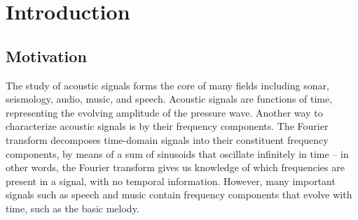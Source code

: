 \documentclass[letter,12pt,notitlepage]{article}
\title{\ThesisTitle}
\author{\vspace{1em}\\Sevag Hanssian \\
  McGill University \\
 \small{\texttt{sevag.hanssian@mail.mcgill.ca}} \\
 \small{\texttt{sevagh@protonmail.com}} \\\ \\\ \\
 \small{Thesis for Master of Arts in Music Technology}\\
 \small{Date TBD, 2021}}
\date{}
\begin{document}
\maketitle

\vspace{3.5em}

\begin{abstract}
	The short-time Fourier transform (STFT) is an important tool for the time-frequency analysis of acoustic signals. The STFT is commonly used as the input representation of music signals in deep learning models. Examples of music information retrieval (MIR) tasks where such models have achieved success are onset detection, beat tracking, and music source separation. Despite its ubiquity, the STFT has a fixed and bounded time-frequency resolution, such that one must sacrifice time for frequency resolution (or vice versa) by changing the window size. The Nonstationary Gabor Transform (NSGT) is an adaptive time-frequency transform which can vary its time-frequency resolution to better represent music signals. In this thesis, first the STFT and NSGT are described as tools for representing and manipulating music signals. Next, the STFT is replaced with different configurations of the NSGT in deep learning models for onset detection, beat tracking, and music source separation respectively, showing significant improvements in the results.
\end{abstract}

\vfill
\clearpage %

\tableofcontents

\vfill
\clearpage %

\listoffigures

\listoflistings

\vfill
\clearpage %

\section{Introduction}
\label{sec:intro}

\subsection{Motivation}

The study of acoustic signals forms the core of many fields including sonar, seismology, audio, music, and speech. Acoustic signals are functions of time, representing the evolving amplitude of the pressure wave. Another way to characterize acoustic signals is by their frequency components. The Fourier transform decomposes time-domain signals into their constituent frequency components, by means of a sum of sinusoids that oscillate infinitely in time -- in other words, the Fourier transform gives us knowledge of which frequencies are present in a signal, with no temporal information. However, many important signals such as speech and music contain frequency components that evolve with time, such as the basic melody.
\end{document}
